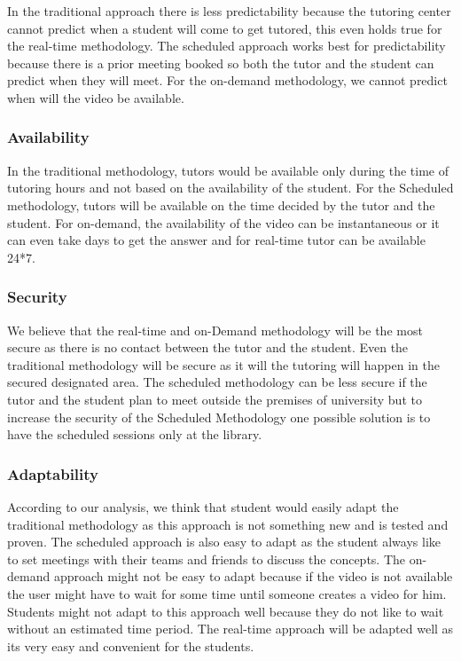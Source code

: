 \documentclass{sig-alternate-05-2015}
\begin{document}
In the traditional approach there is less predictability because the tutoring center cannot predict when a student will come to get tutored, this even holds true for the real-time methodology. The scheduled approach works best for predictability because there is a prior meeting booked so both the tutor and the student can predict when they will meet. For the on-demand methodology, we cannot predict when will the video be available.

\subsubsection{Availability}

 In the traditional methodology, tutors would be available only during the time of tutoring hours and not based on the availability of the student. For the Scheduled methodology, tutors will be available on the time decided by the tutor and the student.  For on-demand, the availability of the video can be instantaneous or it can even take days to get the answer and for real-time tutor can be available 24*7.

\subsubsection{Security}

We believe that the real-time and on-Demand methodology will be the most secure as there is no contact between the tutor and the student. Even the traditional methodology will be secure as it will the tutoring will happen in the secured designated area. The scheduled methodology can be less secure if the tutor and the student plan to meet outside the premises of university but to increase the security of the Scheduled Methodology one possible solution is to have the scheduled sessions only at the library.

\subsubsection{Adaptability}

According to our analysis, we think that student would easily adapt the traditional methodology as this approach is not something new and is tested and proven. The scheduled approach is also easy to adapt as the student always like to set meetings with their teams and friends to discuss the concepts. The on-demand approach might not be easy to adapt because if the video is not available the user might have to wait for some time until someone creates a video for him. Students might not adapt to this approach well because they do not like to wait without an estimated time period.  The real-time approach will be adapted well as its very easy and convenient for the students.
\end{document}
